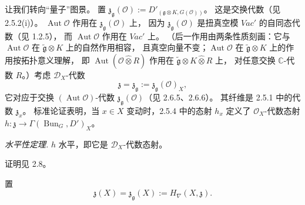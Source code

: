  让我们转向“量子”图景。
置 $\mathfrak{z}_{\mathfrak{g}}(\mathcal{O}):=D'_{(\mathfrak{g}\otimes K,G(\mathcal{O}))}$。
这是交换代数（见 2.5.2(i)）。
$\operatorname{Aut}\mathcal{O}$ 作用在 $\mathfrak{z}_{\mathfrak{g}}(\mathcal{O})$ 上，
因为 $\mathfrak{z}_{\mathfrak{g}}(\mathcal{O})$ 是扭真空模 $\mathit{Vac}'$ 的自同态代数（见 1.2.5），
而 $\operatorname{Aut}\mathcal{O}$ 作用在 $\mathit{Vac}'$ 上。
（后一作用由两条性质刻画：它与 $\operatorname{Aut}\mathcal{O}$ 在 $\tilde{\mathfrak{g}}\otimes K$ 上的自然作用相容，
且真空向量不变；$\operatorname{Aut}\mathcal{O}$ 在 $\tilde{\mathfrak{g}}\otimes K$ 上的作用按拓扑意义理解，
即 $\operatorname{Aut}(\mathcal{O}\hat{\otimes}R)$ 作用在 $\tilde{\mathfrak{g}}\otimes K\hat{\otimes}R$ 上，
对任意交换 $\mathbb{C}$-代数 $R$。）考虑 $\mathcal{D}_X$-代数
\[
\mathfrak{z}=\mathfrak{z}_{\mathfrak{g}}:=\mathfrak{z}_{\mathfrak{g}}(\mathcal{O})_X,
\]
它对应于交换 $(\operatorname{Aut}\mathcal{O})$-代数 $\mathfrak{z}_{\mathfrak{g}}(\mathcal{O})$（见 2.6.5、2.6.6）。
其纤维是 2.5.1 中的代数 $\mathfrak{z}_x$。
标准论证表明，当 $x\in X$ 变动时，2.5.4 中的态射 $h_x$ 定义了
$\mathcal{O}_X$-代数态射 $h: \mathfrak{z}\to\Gamma(\operatorname{Bun}_G,D')_X$。

\emph{水平性定理.} $h$ 水平，即它是 $\mathcal{D}_X$-代数态射。

证明见 2.8。

 置
\begin{equation}\tag{27}
\mathfrak{z}(X)=\mathfrak{z}_{\mathfrak{g}}(X):=H_\nabla(X,\mathfrak{z}).
\end{equation}
